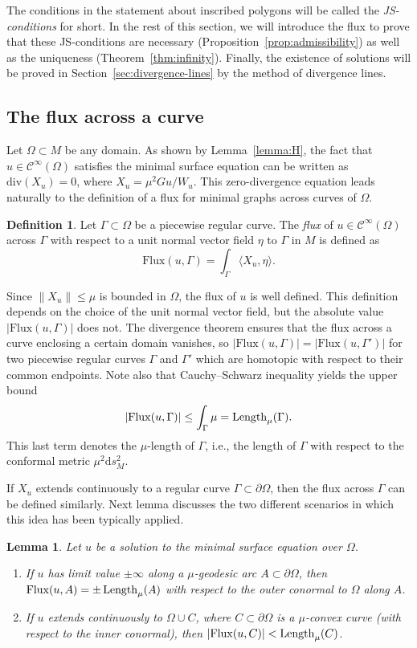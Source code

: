 \documentclass[a4paper,10pt,reqno]{amsart}
\newcommand{\df}{\mathrm{d}}
\newcommand{\Length}{\mathop{\rm Length}\nolimits}
\newcommand{\Flux}{\mathrm{Flux}}
\newtheorem{lemma}[theorem]{Lemma}
\theoremstyle{definition}
\newtheorem{definition}[theorem]{Definition}
\theoremstyle{remark}
\numberwithin{equation}{section}
\begin{document}
The conditions in the statement about inscribed polygons will be called the \emph{JS-conditions} for short. In the rest of this section, we will introduce the flux to prove that these JS-conditions are necessary (Proposition~\ref{prop:admissibility}) as well as the uniqueness (Theorem~\ref{thm:infinity}). Finally, the existence of solutions will be proved in Section~\ref{sec:divergence-lines} by the method of divergence lines.

\subsection{The flux across a curve}\label{subsec:flux}
Let $\Omega\subset M$ be any domain. As shown by Lemma~\ref{lemma:H}, the fact that $u\in\mathcal{C}^\infty(\Omega)$ satisfies the minimal surface equation can be written as $\mathrm{div}(X_u)=0$, where $X_u=\mu^2Gu/W_u$. This zero-divergence equation leads naturally to the definition of a flux for minimal graphs across curves of $\Omega$.

\begin{definition}
Let $\Gamma\subset\Omega$ be a piecewise regular curve. The \emph{flux} of $u\in\mathcal{C}^\infty(\Omega)$ across $\Gamma$ with respect to a unit normal vector field $\eta$ to $\Gamma$ in $M$ is defined as
	\[\Flux(u,\Gamma)=\int_\Gamma\langle X_u,\eta\rangle.\]
\end{definition}

Since $\|X_u\|\leq\mu$ is bounded in $\Omega$, the flux of $u$ is well defined. This definition depends on the choice of the unit normal vector field, but the absolute value $|\Flux(u,\Gamma)|$ does not. The divergence theorem ensures that the flux across a curve enclosing a certain domain vanishes, so $|\Flux(u,\Gamma)|=|\Flux(u,\Gamma')|$ for two piecewise regular curves $\Gamma$ and $\Gamma'$ which are homotopic with respect to their common endpoints. Note also that Cauchy--Schwarz inequality yields the upper bound
\[|\Flux(u,\Gamma)|\leq \int_\Gamma\mu=\Length_\mu(\Gamma).\]
This last term denotes the $\mu$-length of $\Gamma$, i.e., the length of $\Gamma$ with respect to the conformal metric $\mu^2\df s_M^2$. 

If $X_u$ extends continuously to a regular curve $\Gamma\subset\partial\Omega$, then the flux across $\Gamma$ can be defined similarly. Next lemma discusses the two different scenarios in which this idea has been typically applied. 

\begin{lemma}\label{lemma:flux-boundary} 
Let $u$ be a solution to the minimal surface equation over $\Omega$.
\begin{enumerate}[label=\emph{(\arabic*)}]
	\item If $u$ has limit value $\pm\infty$ along a $\mu$-geodesic arc $A\subset\partial\Omega$, then $\Flux(u,A)=\pm\Length_\mu(A)$ with respect to the outer conormal to $\Omega$ along $A$.
	\item If $u$ extends continuously to $\Omega\cup C$, where $C\subset\partial\Omega$ is a $\mu$-convex curve (with respect to the inner conormal), then $|\Flux(u,C)|<\Length_\mu(C)$.
\end{enumerate}
\end{lemma}
\end{document}

